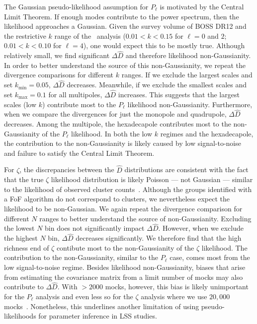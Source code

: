 \documentclass[12pt, letterpaper, preprint]{aastex6}
\newcommand{\Beut}{\citetalias{beutler2017}\xspace}
\newcommand{\ms}[1]{{\color{orange}{\bf MS:}} {[\em #1}]}
\newcommand{\lss}{{\small{LSS}}\xspace}
\begin{document}
The Gaussian pseudo-likelihood assumption for $P_\ell$ is motivated 
by the Central Limit Theorem. If enough modes contribute to the 
power spectrum, then the likelihood approaches a Gaussian. Given the 
survey volume of BOSS DR12 and the restrictive $k$ range of the \Beut~analysis 
($0.01 < k < 0.15$ for $\ell = 0$ and $2$; $0.01 < k < 0.10$ for $\ell = 4$), 
one would expect this to be mostly true. Although relatively small, we
find significant $\Delta \widehat{D}$ and therefore likelihood non-Gaussianity. 
In order to better understand the source of this non-Gaussianity, 
we repeat the divergence comparisons for different $k$ ranges. If we 
exclude the largest scales and set $k_\mathrm{min} = 0.05$, $\Delta \widehat{D}$ 
decreases. Meanwhile, if we exclude the smallest scales and set 
$k_\mathrm{max} = 0.1$ for all 
multipoles, $\Delta \widehat{D}$ increases. This suggests that the largest 
scales (low $k$) contribute most to the $P_\ell$ likelihood non-Gaussianity.
Furthermore, when we compare the divergences for just the monopole and quadrupole, 
$\Delta \widehat{D}$ decreases. Among the multipole, the hexadecapole 
contributes most to the non-Gaussianity of the $P_\ell$ likelihood. 
In both the low $k$ regimes and the hexadecapole, the contribution to 
the non-Gaussianity is likely caused by low signal-to-noise and failure to 
satisfy the Central Limit Theorem.

For $\zeta$, the discrepancies between the $\widehat{D}$ distributions 
are consistent with the fact that the true $\zeta$ likelihood 
distribution is likely Poisson --- not Gaussian --- similar to the likelihood 
of observed cluster counts~\citep{cash1979,planckcollaboration2014,ade2016}. 
Although the groups identified with a FoF algorithm do not correspond
to clusters, we nevertheless expect the likelihood to be non-Gaussian. 
We again repeat the divergence comparison for different $N$ ranges 
to better understand the source of non-Gaussianity. Excluding the 
lowest $N$ bin does not significantly impact $\Delta \widehat{D}$. However, 
when we exclude the highest $N$ bin, $\Delta \widehat{D}$ decreases significantly. 
We therefore find that the high richness end of $\zeta$ contibute most to 
the non-Gaussianity of the $\zeta$ likelihood. The contribution to the 
non-Gaussianity, similar to the $P_\ell$ case, comes most from the low 
signal-to-noise regime. %
Besides likelihood non-Gaussianity, biases that arise from estimating
the covariance matrix from a limit number of mocks may also contribute 
to $\Delta \widehat{D}$. With $ > 2000$ mocks, however, this bias is 
likely unimportant for the $P_\ell$ analysis and even less so for the 
$\zeta$ analysis where we use $20,000$ mocks~\citep{hartlap2009}. 
Nonetheless, this underlines another limitation of using pseudo-likelihoods 
for parameter inference in \lss studies. 
\end{document}
